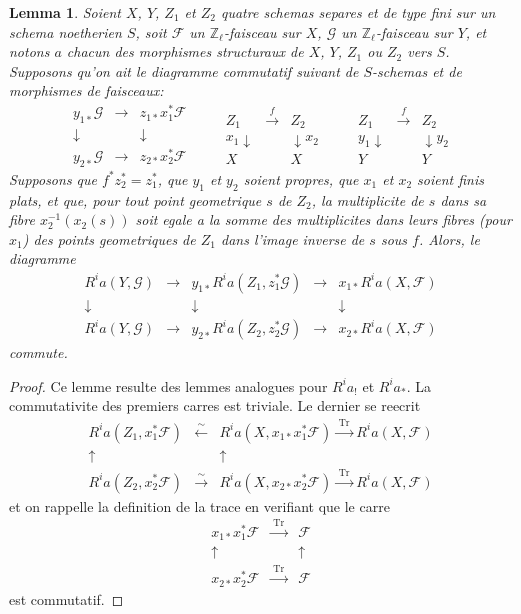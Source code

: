 \documentclass[11pt,reqno]{amsart}
\theoremstyle{plain}
\newtheorem{lemma}[theorem]{Lemma}
\theoremstyle{remark}
\DeclareMathOperator{\Tr}{Tr}
\newcommand{\shF}{\mathcal{F}}
\newcommand{\shG}{\mathcal{G}}
\newcommand{\Z}{\mathbb{Z}}
\numberwithin{equation}{section}
\begin{document}
\begin{lemma}\label{lem:4.6}
Soient $X$, $Y$, $Z_1$ et $Z_2$ quatre schemas separes et de type fini sur un schema noetherien $S$, soit $\shF$ un $\Z_\ell$-faisceau sur $X$, $\shG$ un $\Z_\ell$-faisceau sur $Y$, et notons $a$ chacun des morphismes structuraux de $X$, $Y$, $Z_1$ ou $Z_2$ vers $S$. Supposons qu'on ait le diagramme commutatif suivant de $S$-schemas et de morphismes de faisceaux:
\[
\begin{array}{ccc}
y_{1*}\shG & \longrightarrow & z_{1*}x_1^*\shF \\
\downarrow & & \downarrow \\
y_{2*}\shG & \longrightarrow & z_{2*}x_2^*\shF
\end{array}
\qquad
\begin{array}{ccc}
Z_1 & \xrightarrow{\;f\;} & Z_2 \\
x_1 \downarrow & & \downarrow x_2 \\
X & & X
\end{array}
\qquad
\begin{array}{ccc}
Z_1 & \xrightarrow{\;f\;} & Z_2 \\
y_1 \downarrow & & \downarrow y_2 \\
Y & & Y
\end{array}
\]
Supposons que $f^*z_2^* = z_1^*$, que $y_1$ et $y_2$ soient propres, que $x_1$ et $x_2$ soient finis plats, et que, pour tout point geometrique $s$ de $Z_2$, la multiplicite de $s$ dans sa fibre $x_2^{-1}(x_2(s))$ soit egale a la somme des multiplicites dans leurs fibres (pour $x_1$) des points geometriques de $Z_1$ dans l'image inverse de $s$ sous $f$. Alors, le diagramme
\[
\begin{array}{ccccc}
R^ia(Y, \shG) & \longrightarrow & y_{1*}R^ia(Z_1, z_1^*\shG) & \longrightarrow & x_{1*}R^ia(X, \shF) \\
\downarrow & & \downarrow & & \downarrow \\
R^ia(Y, \shG) & \longrightarrow & y_{2*}R^ia(Z_2, z_2^*\shG) & \longrightarrow & x_{2*}R^ia(X, \shF)
\end{array}
\]
commute.
\end{lemma}

\begin{proof}
Ce lemme resulte des lemmes analogues pour $R^ia_!$ et $R^ia_*$. La commutativite des premiers carres est triviale. Le dernier se reecrit
\[
\begin{array}{ccc}
R^ia(Z_1, x_1^*\shF) & \xleftarrow{\sim} & R^ia(X, x_{1*}x_1^*\shF) \xrightarrow{\;\Tr\;} R^ia(X, \shF) \\
\uparrow & & \uparrow \\
R^ia(Z_2, x_2^*\shF) & \xrightarrow{\sim} & R^ia(X, x_{2*}x_2^*\shF) \xrightarrow{\;\Tr\;} R^ia(X, \shF)
\end{array}
\]
et on rappelle la definition de la trace en verifiant que le carre
\[
\begin{array}{ccc}
x_{1*}x_1^*\shF & \xrightarrow{\;\Tr\;} & \shF \\
\uparrow & & \uparrow \\
x_{2*}x_2^*\shF & \xrightarrow{\;\Tr\;} & \shF
\end{array}
\]
est commutatif.
\end{proof}
\end{document}

